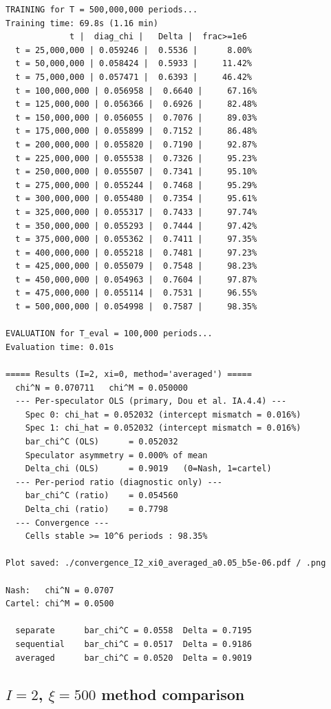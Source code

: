 \begin{lstlisting}[style=outputstyle]
TRAINING for T = 500,000,000 periods...
Training time: 69.8s (1.16 min)
             t |  diag_chi |   Delta |  frac>=1e6
  t = 25,000,000 | 0.059246 |  0.5536 |      8.00%
  t = 50,000,000 | 0.058424 |  0.5933 |     11.42%
  t = 75,000,000 | 0.057471 |  0.6393 |     46.42%
  t = 100,000,000 | 0.056958 |  0.6640 |     67.16%
  t = 125,000,000 | 0.056366 |  0.6926 |     82.48%
  t = 150,000,000 | 0.056055 |  0.7076 |     89.03%
  t = 175,000,000 | 0.055899 |  0.7152 |     86.48%
  t = 200,000,000 | 0.055820 |  0.7190 |     92.87%
  t = 225,000,000 | 0.055538 |  0.7326 |     95.23%
  t = 250,000,000 | 0.055507 |  0.7341 |     95.10%
  t = 275,000,000 | 0.055244 |  0.7468 |     95.29%
  t = 300,000,000 | 0.055480 |  0.7354 |     95.61%
  t = 325,000,000 | 0.055317 |  0.7433 |     97.74%
  t = 350,000,000 | 0.055293 |  0.7444 |     97.42%
  t = 375,000,000 | 0.055362 |  0.7411 |     97.35%
  t = 400,000,000 | 0.055218 |  0.7481 |     97.23%
  t = 425,000,000 | 0.055079 |  0.7548 |     98.23%
  t = 450,000,000 | 0.054963 |  0.7604 |     97.87%
  t = 475,000,000 | 0.055114 |  0.7531 |     96.55%
  t = 500,000,000 | 0.054998 |  0.7587 |     98.35%

EVALUATION for T_eval = 100,000 periods...
Evaluation time: 0.01s

===== Results (I=2, xi=0, method='averaged') =====
  chi^N = 0.070711   chi^M = 0.050000
  --- Per-speculator OLS (primary, Dou et al. IA.4.4) ---
    Spec 0: chi_hat = 0.052032 (intercept mismatch = 0.016%)
    Spec 1: chi_hat = 0.052032 (intercept mismatch = 0.016%)
    bar_chi^C (OLS)      = 0.052032
    Speculator asymmetry = 0.000% of mean
    Delta_chi (OLS)      = 0.9019   (0=Nash, 1=cartel)
  --- Per-period ratio (diagnostic only) ---
    bar_chi^C (ratio)    = 0.054560
    Delta_chi (ratio)    = 0.7798
  --- Convergence ---
    Cells stable >= 10^6 periods : 98.35%

Plot saved: ./convergence_I2_xi0_averaged_a0.05_b5e-06.pdf / .png

Nash:   chi^N = 0.0707
Cartel: chi^M = 0.0500

  separate      bar_chi^C = 0.0558  Delta = 0.7195
  sequential    bar_chi^C = 0.0517  Delta = 0.9186
  averaged      bar_chi^C = 0.0520  Delta = 0.9019
\end{lstlisting}

\subsection{$I=2$, $\xi=500$ method comparison}


